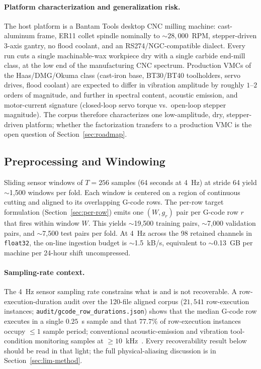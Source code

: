 \documentclass[sensors,article,submit,moreauthors,pdftex]{Definitions/mdpi}
\begin{document}
\paragraph{Platform characterization and generalization risk.} The host platform is a Bantam Tools desktop CNC milling machine: cast-aluminum frame, ER11 collet spindle nominally to $\sim 28{,}000$~RPM, stepper-driven 3-axis gantry, no flood coolant, and an RS274/NGC-compatible dialect. Every run cuts a single machinable-wax workpiece dry with a single carbide end-mill class, at the low end of the manufacturing CNC spectrum. Production VMCs of the Haas/DMG/Okuma class (cast-iron base, BT30/BT40 toolholders, servo drives, flood coolant) are expected to differ in vibration amplitude by roughly $1$--$2$ orders of magnitude, and further in spectral content, acoustic emission, and motor-current signature (closed-loop servo torque vs.\ open-loop stepper magnitude). The corpus therefore characterizes one low-amplitude, dry, stepper-driven platform; whether the factorization transfers to a production VMC is the open question of Section~\ref{sec:roadmap}.

\subsection{Preprocessing and Windowing}
\label{sec:preprocessing}

Sliding sensor windows of $T=256$ samples (64 seconds at 4~Hz) at stride 64 yield $\sim$1{,}500 windows per fold. Each window is centered on a region of continuous cutting and aligned to its overlapping G-code rows. The per-row target formulation (Section~\ref{sec:per-row}) emits one $(W, g_r)$ pair per G-code row $r$ that fires within window $W$. This yields $\sim$19{,}500 training pairs, $\sim$7{,}000 validation pairs, and $\sim$7{,}500 test pairs per fold. At 4~Hz across the 98 retained channels in \texttt{float32}, the on-line ingestion budget is $\sim$1.5~kB/s, equivalent to $\sim$0.13~GB per machine per 24-hour shift uncompressed.

\paragraph{Sampling-rate context.} The 4~Hz sensor sampling rate constrains what is and is not recoverable. A row-execution-duration audit over the 120-file aligned corpus ($21{,}541$ row-execution instances; \texttt{audit/gcode\_row\_durations.json}) shows that the median G-code row executes in a single $0.25$~s sample and that $77.7\%$ of row-execution instances occupy $\le\!1$ sample period; conventional acoustic-emission and vibration tool-condition monitoring samples at $\geq\!10$~kHz~\cite{teti2010advanced}. Every recoverability result below should be read in that light; the full physical-aliasing discussion is in Section~\ref{sec:lim-method}.
\end{document}
